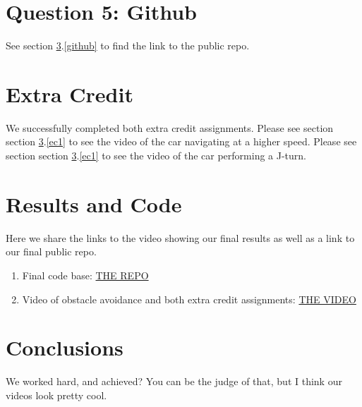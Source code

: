 \documentclass[12pt]{article}
\begin{document}
\maketitle











\section{Question 5: Github}

See section \ref{results}.\ref{github} to find the link to the public repo. 



\section{Extra Credit} 

We successfully completed both extra credit assignments. Please see section section \ref{results}.\ref{ec1} to see the video of the car navigating at a higher speed. Please see section section \ref{results}.\ref{ec1} to see the video of the car performing a J-turn. 

\section{Results and Code}\label{results}
Here we share the links to the video showing our final results as well as a link to our final public repo. 

\begin{enumerate}
	\item\label{github} Final code base: \href{https://github.com/jbhoffman613/cs393r_hw1}{THE REPO}
	\item\label{ec1} Video of obstacle avoidance and both extra credit assignments: \href{https://drive.google.com/file/d/1DpRamrBsjsI_Y-iftgcQk7L3LIv6SVPm/view?usp=sharing}{THE VIDEO}
\end{enumerate}

\section{Conclusions}\label{conclusions}
We worked hard, and achieved? You can be the judge of that, but I think our videos look pretty cool. 
\end{document}
